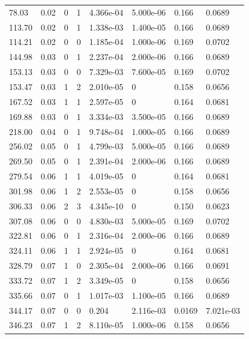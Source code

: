 \documentclass[preview]{standalone}
\begin{document}
{{\begin{tabular}{L{1.2cm}C{1.2cm} C{0.3cm}C{0.5cm} C{1.4cm}C{1.4cm} C{1.4cm}C{1.4cm}}
  78.03  &  0.02  & 0     &  1 &  4.366e-04  & 5.000e-06  & 0.166 &  0.0689   \\ 
  113.70  &  0.02  & 0     &  1 &  1.338e-03  & 1.400e-05  & 0.166 &  0.0689   \\ 
  114.21  &  0.02  & 0     &  0 &  1.185e-04  & 1.000e-06  & 0.169 &  0.0702   \\ 
  144.98  &  0.03  & 0     &  1 &  2.237e-04  & 2.000e-06  & 0.166 &  0.0689   \\ 
  153.13  &  0.03  & 0     &  0 &  7.329e-03  & 7.600e-05  & 0.169 &  0.0702   \\ 
  153.47  &  0.03  & 1     &  2 &  2.010e-05  & 0  & 0.158 &  0.0656   \\ 
  167.52  &  0.03  & 1     &  1 &  2.597e-05  & 0  & 0.164 &  0.0681   \\ 
  169.88  &  0.03  & 0     &  1 &  3.334e-03  & 3.500e-05  & 0.166 &  0.0689   \\ 
  218.00  &  0.04  & 0     &  1 &  9.748e-04  & 1.000e-05  & 0.166 &  0.0689   \\ 
  256.02  &  0.05  & 0     &  1 &  4.799e-03  & 5.000e-05  & 0.166 &  0.0689   \\ 
  269.50  &  0.05  & 0     &  1 &  2.391e-04  & 2.000e-06  & 0.166 &  0.0689   \\ 
  279.54  &  0.06  & 1     &  1 &  4.019e-05  & 0  & 0.164 &  0.0681   \\ 
  301.98  &  0.06  & 1     &  2 &  2.553e-05  & 0  & 0.158 &  0.0656   \\ 
  306.33  &  0.06  & 2     &  3 &  4.345e-10  & 0  & 0.150 &  0.0623   \\ 
  307.08  &  0.06  & 0     &  0 &  4.830e-03  & 5.000e-05  & 0.169 &  0.0702   \\ 
  322.81  &  0.06  & 0     &  1 &  2.316e-04  & 2.000e-06  & 0.166 &  0.0689   \\ 
  324.11  &  0.06  & 1     &  1 &  2.924e-05  & 0  & 0.164 &  0.0681   \\ 
  328.79  &  0.07  & 1     &  0 &  2.305e-04  & 2.000e-06  & 0.166 &  0.0691   \\ 
  333.72  &  0.07  & 1     &  2 &  3.349e-05  & 0  & 0.158 &  0.0656   \\ 
  335.66  &  0.07  & 0     &  1 &  1.017e-03  & 1.100e-05  & 0.166 &  0.0689   \\ 
  344.17  &  0.07  & 0     &  0 &  0.204  & 2.116e-03  & 0.0169 &  7.021e-03   \\ 
  346.23  &  0.07  & 1     &  2 &  8.110e-05  & 1.000e-06  & 0.158 &  0.0656   \\ 

\end{tabular}}}
\end{document}

